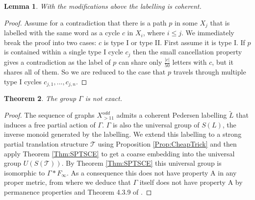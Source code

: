 \documentclass[11pt,a4paper]{amsart}
\theoremstyle{plain}
\newtheorem{theorem}{Theorem}%
\newtheorem{lemma}[theorem]{Lemma}%
\theoremstyle{definition}%
\theoremstyle{remark}%
\begin{document}
\begin{lemma}
With the modifications above the labelling is coherent.
\end{lemma}
\begin{proof}
Assume for a contradiction that there is a path $p$ in some $X_{j}$ that is labelled with the same word as a cycle $c$ in $X_{i}$, where $i \leq j$. We immediately break the proof into two cases: $c$ is type I or type II. First assume it is type I. If $p$ is contained within a single type I cycle $c_{j}$ then the small cancellation property gives a contradiction as the label of $p$ can share only $\frac{\vert c \vert}{50}$ letters with $c$, but it shares all of them. So we are reduced to the case that $p$ travels through multiple type I cycles $c_{j,1},...,c_{j,n}$.
\end{proof}


\begin{theorem}
The group $\Gamma$ is not exact.
\end{theorem}
\begin{proof}
The sequence of graphs $X_{>11}^{odd}$ admits a coherent Pedersen labelling $\tilde{L}$ that induces a free partial action of $\Gamma$. $\Gamma$ is also the universal group of $S(L)$, the inverse monoid generated by the labelling. We extend this labelling to a strong partial translation structure $\mathcal{T}$ using Proposition \ref{Prop:CheapTrick} and then apply Theorem \ref{Thm:SPTSCE} to get a coarse embedding into the universal group $U(S(\mathcal{T}))$. By Theorem \ref{Thm:SPTSCE} this universal group is isomorphic to $\Gamma \ast F_{\infty}$. As a consequence this does not have property A in any proper metric, from where we deduce that $\Gamma$ itself does not have property A by permanence properties \cite[Guentner]{} and Theorem 4.3.9 of \cite[Rufus' notes on A]{}. 
\end{proof}




\end{document}
